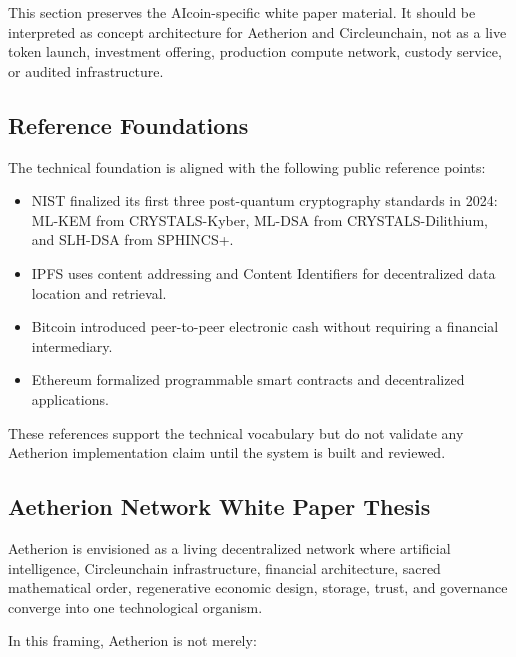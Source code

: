 ﻿\documentclass[12pt]{article}
\begin{document}
This section preserves the AIcoin-specific white paper material. It should be interpreted as concept architecture for Aetherion and Circleunchain, not as a live token launch, investment offering, production compute network, custody service, or audited infrastructure.

\subsection{Reference Foundations}


The technical foundation is aligned with the following public reference points:

\begin{itemize}
  \item NIST finalized its first three post-quantum cryptography standards in 2024: ML-KEM from CRYSTALS-Kyber, ML-DSA from CRYSTALS-Dilithium, and SLH-DSA from SPHINCS+.
\end{itemize}
\begin{itemize}
  \item IPFS uses content addressing and Content Identifiers for decentralized data location and retrieval.
\end{itemize}
\begin{itemize}
  \item Bitcoin introduced peer-to-peer electronic cash without requiring a financial intermediary.
\end{itemize}
\begin{itemize}
  \item Ethereum formalized programmable smart contracts and decentralized applications.
\end{itemize}

These references support the technical vocabulary but do not validate any Aetherion implementation claim until the system is built and reviewed.

\subsection{Aetherion Network White Paper Thesis}


Aetherion is envisioned as a living decentralized network where artificial intelligence, Circleunchain infrastructure, financial architecture, sacred mathematical order, regenerative economic design, storage, trust, and governance converge into one technological organism.

In this framing, Aetherion is not merely:
\end{document}
